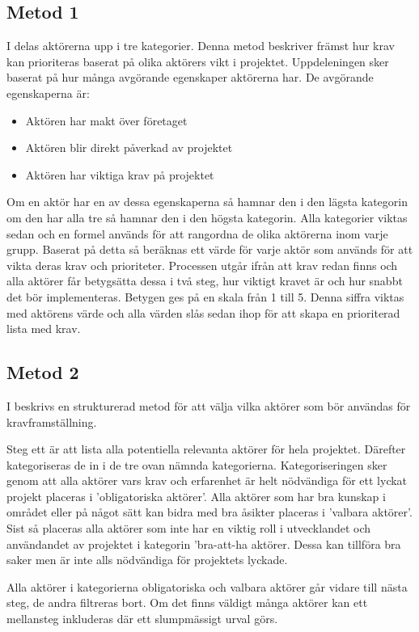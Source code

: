 \subsection{Metod 1}\label{sec:cs_met1}
I \cite{cs_novel} delas aktörerna upp i tre kategorier. Denna metod beskriver främst hur krav kan prioriteras baserat på olika aktörers vikt i projektet.
Uppdeleningen sker baserat på hur många avgörande egenskaper aktörerna har. De avgörande egenskaperna är:
\begin{itemize}
	\item Aktören har makt över företaget
	\item Aktören blir direkt påverkad av projektet
	\item Aktören har viktiga krav på projektet
\end{itemize}

Om en aktör har en av dessa egenskaperna så hamnar den i den lägsta kategorin om den har alla tre så hamnar den i den högsta kategorin. Alla kategorier viktas sedan och en formel används för att rangordna de olika aktörerna inom varje grupp. Baserat på detta så beräknas ett värde för varje aktör som används för att vikta deras krav och prioriteter. Processen utgår ifrån att krav redan finns och alla aktörer får betygsätta dessa i två steg, hur viktigt kravet är och hur snabbt det bör implementeras. Betygen ges på en skala från 1 till 5. Denna siffra viktas med aktörens värde och alla värden slås sedan ihop för att skapa en prioriterad lista med krav.

\subsection{Metod 2}\label{sec:cs_met2}
I \cite{cs_structured} beskrivs en strukturerad metod för att välja vilka aktörer som bör användas för kravframställning.

Steg ett är att lista alla potentiella relevanta aktörer för hela projektet.
Därefter kategoriseras de in i de tre ovan nämnda kategorierna. Kategoriseringen sker genom att alla aktörer vars krav och erfarenhet är helt nödvändiga för ett lyckat projekt placeras i 'obligatoriska aktörer'. Alla aktörer som har bra kunskap i området eller på något sätt kan bidra med bra åsikter placeras i 'valbara aktörer'. Sist så placeras alla aktörer som inte har en viktig roll i utvecklandet och användandet av projektet i kategorin 'bra-att-ha aktörer. Dessa kan tillföra bra saker men är inte alls nödvändiga för projektets lyckade.

Alla aktörer i kategorierna obligatoriska och valbara aktörer går vidare till nästa steg, de andra filtreras bort. Om det finns väldigt många aktörer kan ett mellansteg inkluderas där ett slumpmässigt urval görs.

